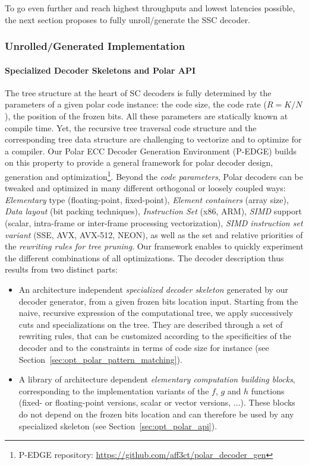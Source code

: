 To go even further and reach highest throughputs and lowest latencies possible,
the next section proposes to fully unroll/generate the SSC decoder.

\subsubsection{Unrolled/Generated Implementation}
\label{sec:opt_polar_pedge}

\paragraph{Specialized Decoder Skeletons and Polar API}

The tree structure at the heart of SC decoders is fully determined by the
parameters of a given polar code instance: the code size, the code rate ($R = K
/ N$), the position of the frozen bits. All these parameters are  statically
known at compile time. Yet, the recursive tree traversal code structure and the
corresponding tree data structure are challenging to vectorize and to optimize
for a compiler. Our Polar ECC Decoder Generation Environment (P-EDGE) builds on
this property to provide a general framework for polar decoder design,
generation and optimization\footnote{P-EDGE repository: \url{https://github.com/aff3ct/polar_decoder_gen}}.
Beyond the \emph{code parameters}, Polar decoders
can be tweaked and optimized in many different orthogonal or loosely coupled
ways: \emph{Elementary} type (floating-point, fixed-point),
\emph{Element containers} (array size), \emph{Data layout} (bit packing
techniques), \emph{Instruction Set} (x86, ARM\R), \emph{SIMD} support (scalar,
intra-frame or inter-frame processing vectorization), \emph{SIMD instruction set
variant} (SSE, AVX, AVX-512, NEON), as well as the set and relative priorities
of the \emph{rewriting rules for tree pruning}. Our framework enables to quickly
experiment the different combinations of all optimizations. The decoder
description thus results from two distinct parts:
\begin{itemize}
  \item An architecture independent \emph{specialized decoder skeleton}
    generated by our decoder generator, from a given frozen bits location input.
    Starting from the naive, recursive expression of the computational tree, we
    apply successively cuts and specializations on the tree. They are described
    through a set of rewriting rules, that can be customized according to the
    specificities of the decoder and to the constraints in terms of code size
    for instance (see Section~\ref{sec:opt_polar_pattern_matching}).
  \item A library of architecture dependent \emph{elementary computation
    building blocks}, corresponding to the implementation variants of the $f$,
    $g$ and $h$ functions (fixed- or floating-point versions, scalar or vector
    versions, ...). These blocks do not depend on the frozen bits location and
    can therefore be used by any specialized skeleton (see
    Section~\ref{sec:opt_polar_api}).
\end{itemize}

